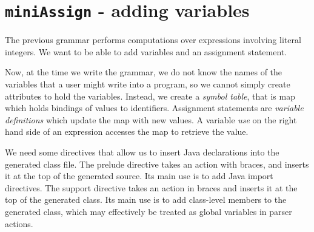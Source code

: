 \section{{\tt miniAssign} - adding variables}
The previous grammar performs computations over expressions involving
literal integers. We want to be able to add variables and an
assignment statement.

Now, at the time we write the grammar, we do not know the names of the
variables that a user might write into a program, so we cannot simply
create attributes to hold the variables. Instead, we create a {\em symbol table}, that is map
which holds bindings of values to identifiers. Assignment statements are {\em variable definitions}
which update the map with new values. A variable {\em use} on the right hand side
of an expression accesses the map to retrieve the value.

We need some directives that allow us to insert Java declarations into the generated class file. The {\sf prelude} directive takes an action with braces, and inserts it at the top of the generated source. Its main use is to add Java import directives. The {\sf support} directive takes an action in braces and inserts it at the top of the generated class. Its main use is to add class-level members to the generated class, which may effectively be treated as global variables in parser actions.

